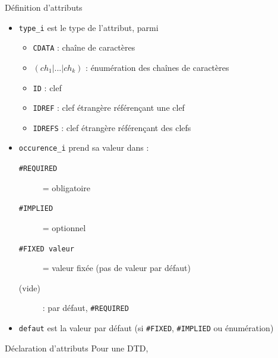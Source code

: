 \begin{frame}{Définition d'attributs}
\begin{itemize}
 \item \texttt{type\_i} est le type de l'attribut, parmi \\
  \begin{itemize}
  \item \texttt{CDATA} : cha\^ine de caractères 
  \item $(ch_1 | ... |ch_k)$ : énumération des cha\^ines de caractères  
  \item \texttt{ID} : clef
  \item \texttt{IDREF} : clef étrangère référen\c{c}ant \alert{une} clef
  \item \texttt{IDREFS} : clef étrangère référen\c{c}ant \alert{des} clefs 
   \end{itemize}

\framebreak

\item \texttt{occurence\_i}  prend sa valeur dans :
  \begin{description}
  \item[\texttt{\#REQUIRED}] = obligatoire 
  \item[\texttt{\#IMPLIED}] = optionnel 
  \item[\texttt{\#FIXED valeur}] = valeur fixée (pas de valeur par défaut)
  \item[(vide)] : par défaut, \texttt{\#REQUIRED}
  \end{description}

\item \texttt{defaut} est la valeur par défaut (si \texttt{\#FIXED}, \texttt{\#IMPLIED} ou énumération)

\end{itemize}


\end{frame}

\begin{frame}[containsverbatim]{Déclaration d'attributs}
Pour une DTD, 
\end{frame}


